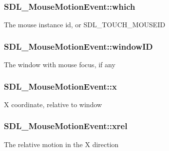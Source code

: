 \subsubsection[{\texorpdfstring{which}{which}}]{ S\+D\+L\+\_\+\+Mouse\+Motion\+Event\+::which}\hypertarget{struct_s_d_l___mouse_motion_event_a6f04c17b4305683915e2fd2dc3c36dbc}{}\label{struct_s_d_l___mouse_motion_event_a6f04c17b4305683915e2fd2dc3c36dbc}
The mouse instance id, or S\+D\+L\+\_\+\+T\+O\+U\+C\+H\+\_\+\+M\+O\+U\+S\+E\+ID 
\subsubsection[{\texorpdfstring{window\+ID}{windowID}}]{ S\+D\+L\+\_\+\+Mouse\+Motion\+Event\+::window\+ID}\hypertarget{struct_s_d_l___mouse_motion_event_aa9976725242ada93a9e18e7fdf5796e6}{}\label{struct_s_d_l___mouse_motion_event_aa9976725242ada93a9e18e7fdf5796e6}
The window with mouse focus, if any 
\subsubsection[{\texorpdfstring{x}{x}}]{ S\+D\+L\+\_\+\+Mouse\+Motion\+Event\+::x}\hypertarget{struct_s_d_l___mouse_motion_event_a36398bb4a5308446a262b0bfc8baa80a}{}\label{struct_s_d_l___mouse_motion_event_a36398bb4a5308446a262b0bfc8baa80a}
X coordinate, relative to window 
\subsubsection[{\texorpdfstring{xrel}{xrel}}]{ S\+D\+L\+\_\+\+Mouse\+Motion\+Event\+::xrel}\hypertarget{struct_s_d_l___mouse_motion_event_a1c01d9aba2a20778fb45a15dca39ef58}{}\label{struct_s_d_l___mouse_motion_event_a1c01d9aba2a20778fb45a15dca39ef58}
The relative motion in the X direction 
